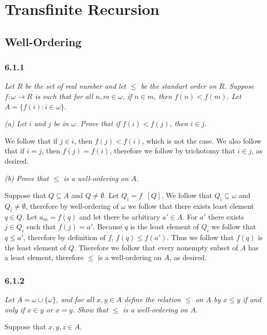 \documentclass[11pt,oneside,titlepage]{book}
\DeclareMathOperator \inv {^{-1}}
\begin{document}
\chapter{Transfinite Recursion}

\section{Well-Ordering}

\subsection*{6.1.1}

\textit{Let $R$ be the set of real number and let $\leq$ be the standart order on $R$.
  Suppose $f: \omega \to R$ is such that for all $n, m \in \omega$, if $n \in m$,
  then $f(n) < f(m)$. Let $A = \{f(i): i \in \omega\}$.}

\textit{(a) Let $i$ and $j$ be in $\omega$. Prove that if $f(i) < f(j)$, then
  $i \in j$.}

We follow that if $j \in i$, then $f(j) < f(i)$, which is not the case.
We also follow that if $i = j$, then $f(j) = f(i)$, therefore we follow by trichotomy that
$i \in j$, as desired.


\textit{(b) Prove that $\leq$ is a well-ordering on $A$.}

Suppose that $Q \subseteq A$ and $Q \neq \emptyset$. Let $Q_i = f\inv[Q]$. We
follow that $Q_i \subseteq \omega$ and $Q_i \neq \emptyset$, therefore by
well-ordering of $\omega$ we follow that there exists least element $q \in Q$.
Let $a_m = f(q)$ and let there be arbitrary $a' \in A$.
For $a'$ there exists $j \in Q_i$  such that $f(j) = a'$.
Because $q$ is the least element of $Q_i$ we follow that $q \leq a'$, therefore
by definition of $f$, $f(q) \leq f(a')$. Thus we follow that
$f(q)$ is the least element of $Q$. Therefore we follow that
every nonempty subset of $A$ has a least element, therefore $\leq$ is
a well-ordering on $A$, as desired.

\subsection*{6.1.2}

\textit{Let $A = \omega \cup \{\omega\}$, and for all $x,y \in A$ define
  the relation $\leq$ on $A$ by $x \leq y$ if and only if $x \in y$ or $x = y$.
  Show that $\leq$ is a well-ordering on $A$.}

Suppose that $x, y, z \in A$. 
\end{document}
